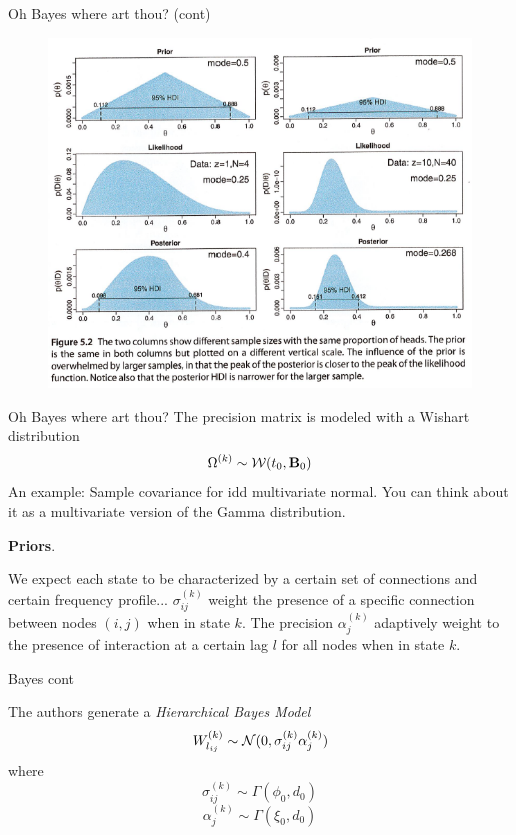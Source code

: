 \documentclass{beamer}
\begin{document}
\begin{frame}{Oh Bayes where art thou? (cont)}
	\begin{figure}[h]
		\centering
			\includegraphics[scale=0.65]{../Figures/fig_bayes_prior.png}
	\end{figure}
\end{frame}


\begin{frame}{Oh Bayes where art thou?}
	The precision matrix is modeled with a Wishart distribution
	\begin{equation}
		\Omega^{(k)} \sim {\cal W}(t_0,\mathbf{B}_0)
	\end{equation}
 An example: Sample covariance for idd multivariate normal. You can think about it as a multivariate version of the Gamma distribution.
 
 \textbf{Priors}.
 
 We expect each state to be characterized by a certain set of connections and certain frequency profile... $\sigma_{ij}^{(k)}$ weight the presence of a specific connection between nodes $(i,j)$ when in state $k$. The precision $\alpha_j^{(k)}$ adaptively weight to the presence of interaction at a certain lag $l$ for all nodes when in state $k$.
 
 
\end{frame}

\begin{frame}{Bayes cont}
	
The authors generate a \textit{Hierarchical Bayes Model}
	\begin{equation}
		W_{l_{ij}}^{(k)} \sim {\cal N}(0, \sigma_{ij}^{(k)} \alpha_j^{(k)} )
	\end{equation}
	where 
	\begin{equation}
		\sigma_{ij}^{(k)}\sim \Gamma (\phi_0, d_0)
	\end{equation}
	\begin{equation}
		\alpha_j^{(k)} \sim \Gamma (\xi_0, d_0)
	\end{equation}
\end{frame}
\end{document}

